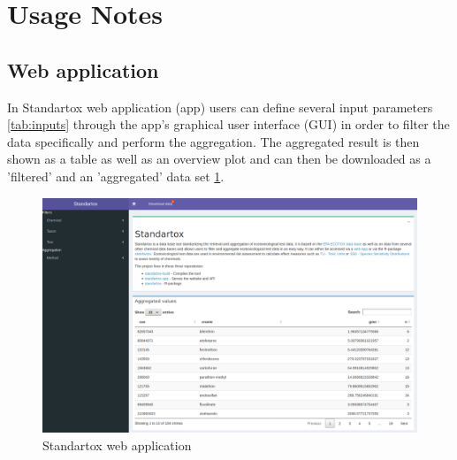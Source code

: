 \section*{Usage Notes}




\subsection*{Web application}

In Standartox web application (app) users can define several input parameters \ref{tab:inputs} through the app's graphical user interface (GUI) in order to filter the data specifically and perform the aggregation. The aggregated result is then shown as a table as well as an overview plot and can then be downloaded as a 'filtered' and an 'aggregated' data set \ref{fig:standartox_app}.

\begin{figure}
    \includegraphics[width=1\linewidth]{article/figures/screenshot_standartox_app.png}
    \caption{Standartox web application}
    \label{fig:standartox_app}
\end{figure}


